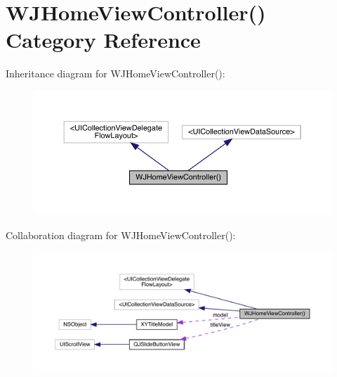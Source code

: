 \hypertarget{category_w_j_home_view_controller_07_08}{}\section{W\+J\+Home\+View\+Controller() Category Reference}
\label{category_w_j_home_view_controller_07_08}


Inheritance diagram for W\+J\+Home\+View\+Controller()\+:\nopagebreak
\begin{figure}[H]
\begin{center}
\leavevmode
\includegraphics[width=350pt]{category_w_j_home_view_controller_07_08__inherit__graph}
\end{center}
\end{figure}


Collaboration diagram for W\+J\+Home\+View\+Controller()\+:\nopagebreak
\begin{figure}[H]
\begin{center}
\leavevmode
\includegraphics[width=350pt]{category_w_j_home_view_controller_07_08__coll__graph}
\end{center}
\end{figure}
